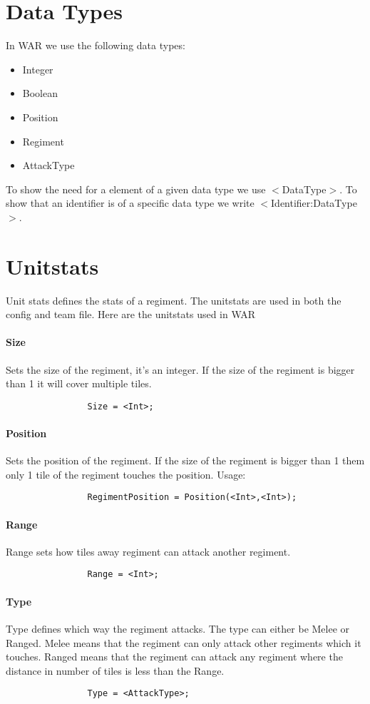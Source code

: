 \section{Data Types}
	In WAR we use the following data types: \\
	\begin{itemize}
		\item Integer
		\item Boolean
		\item Position
		\item Regiment
		\item AttackType
	\end{itemize}
	To show the need for a element of a given data type we use $<$DataType$>$.
	To show that an identifier is of a specific data type we write $<$Identifier:DataType$>$.

\section{Unitstats}
	Unit stats defines the stats of a regiment. The unitstats are used in both the config and team file. Here are the unitstats used in WAR
		\paragraph{Size}
			Sets the size of the regiment, it's an integer.
			If the size of the regiment is bigger than 1 it will cover multiple tiles.
			\begin{verbatim}
				Size = <Int>;
			\end{verbatim}
		\paragraph{Position}
			Sets the position of the regiment. If the size of the regiment is bigger than 1 them 
			only 1 tile of the regiment touches the position. Usage: 
			\begin{verbatim}
				RegimentPosition = Position(<Int>,<Int>);
			\end{verbatim}
		\paragraph{Range}
			Range sets how tiles away regiment can attack another regiment.
			\begin{verbatim}
				Range = <Int>;
			\end{verbatim}
		\paragraph{Type}
			Type defines which way the regiment attacks. The type can either be Melee or Ranged.
			Melee means that the regiment can only attack other regiments which it touches. Ranged means 
			that the regiment can attack any regiment where the distance in number of tiles is less than the Range.
			\begin{verbatim}
				Type = <AttackType>; 
			\end{verbatim}	
